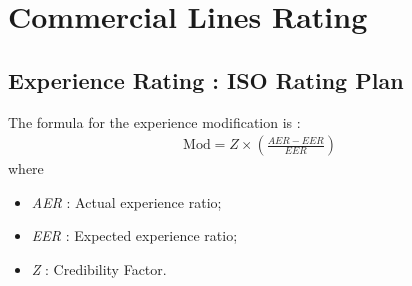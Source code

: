 \documentclass[11pt, english]{memoir}
\numberwithin{definition}{section}
\begin{document}
\chapter{Commercial Lines Rating}


\section{Experience Rating : ISO Rating Plan}

The formula for the experience modification is : 
\begin{align*}
\text{Mod} = Z \times \left(\frac{AER - EER}{EER}\right)
\end{align*}
where
\begin{itemize}
	\item \emph{AER} : Actual experience ratio;
	\item \emph{EER} : Expected experience ratio;
	\item \emph{Z} : Credibility Factor.
\end{itemize}
\end{document}
